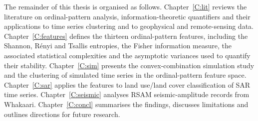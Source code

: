 The remainder of this thesis is organised as follows.
Chapter~\ref{C:lit} reviews the literature on ordinal-pattern analysis, information-theoretic quantifiers and their applications to time series clustering and to geophysical and remote-sensing data.
Chapter~\ref{C:features} defines the thirteen ordinal-pattern features, including the Shannon, R\'enyi and Tsallis entropies, the Fisher information measure, the associated statistical complexities and the asymptotic variances used to quantify their stability.
Chapter~\ref{C:sim} presents the convex-combination simulation study and the clustering of simulated time series in the ordinal-pattern feature space.
Chapter~\ref{C:sar} applies the features to land use/land cover classification of SAR time series.
Chapter~\ref{C:seismic} analyses RSAM seismic-amplitude records from Whakaari.
Chapter~\ref{C:concl} summarises the findings, discusses limitations and outlines directions for future research.